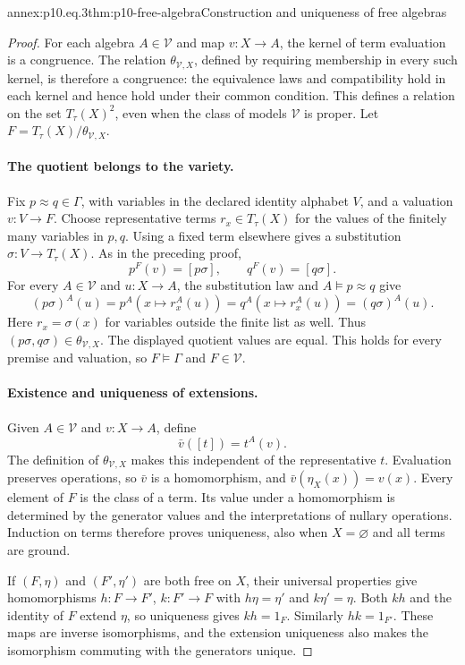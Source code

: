 \begin{annexitem}{annex:p10.eq.3}{thm:p10-free-algebra}{Construction and uniqueness of free algebras}
\begin{proof}
For each algebra \(A\in\mathcal V\) and map \(v:X\to A\), the kernel
of term evaluation is a congruence.
The relation \(\theta_{\mathcal V,X}\), defined by requiring
membership in every such kernel, is therefore a congruence:
the equivalence laws and compatibility hold in each kernel and
hence hold under their common condition.
This defines a relation on the set \(T_\tau(X)^2\), even when the
class of models \(\mathcal V\) is proper.
Let \(F=T_\tau(X)/\theta_{\mathcal V,X}\).

\paragraph{The quotient belongs to the variety.}
Fix \(p\approx q\in\Gamma\), with variables in the declared identity
alphabet \(V\), and a valuation \(v:V\to F\).
Choose representative terms \(r_x\in T_\tau(X)\) for the values
of the finitely many variables in \(p,q\).
Using a fixed term elsewhere gives a substitution
\(\sigma:V\to T_\tau(X)\).
As in the preceding proof,
\[
 p^F(v)=[p\sigma],\qquad q^F(v)=[q\sigma].
\]
For every \(A\in\mathcal V\) and \(u:X\to A\), the substitution law
and \(A\models p\approx q\) give
\[
 (p\sigma)^A(u)=p^A(x\mapsto r_x^A(u))
              =q^A(x\mapsto r_x^A(u))=(q\sigma)^A(u).
\]
Here \(r_x=\sigma(x)\) for variables outside the finite list as well.
Thus \((p\sigma,q\sigma)\in\theta_{\mathcal V,X}\).
The displayed quotient values are equal.
This holds for every premise and valuation, so \(F\models\Gamma\)
and \(F\in\mathcal V\).

\paragraph{Existence and uniqueness of extensions.}
Given \(A\in\mathcal V\) and \(v:X\to A\), define
\[
 \bar v([t])=t^A(v).
\]
The definition of \(\theta_{\mathcal V,X}\) makes this independent
of the representative \(t\).
Evaluation preserves operations, so \(\bar v\) is a homomorphism,
and \(\bar v(\eta_X(x))=v(x)\).
Every element of \(F\) is the class of a term.
Its value under a homomorphism is determined by the generator
values and the interpretations of nullary operations.
Induction on terms therefore proves uniqueness, also when
\(X=\varnothing\) and all terms are ground.

If \((F,\eta)\) and \((F',\eta')\) are both free on \(X\), their
universal properties give homomorphisms
\(h:F\to F'\), \(k:F'\to F\) with
\(h\eta=\eta'\) and \(k\eta'=\eta\).
Both \(kh\) and the identity of \(F\) extend \(\eta\), so uniqueness
gives \(kh=1_F\).
Similarly \(hk=1_{F'}\).
These maps are inverse isomorphisms, and the extension uniqueness
also makes the isomorphism commuting with the generators unique.
\end{proof}
\end{annexitem}
